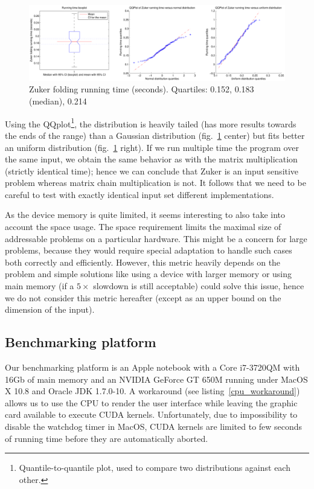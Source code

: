 \begin{figure}[H]\begin{center}\includegraphics[width=16cm]{inc/var_zuker.pdf}\end{center}
\caption{Zuker folding running time (seconds). Quartiles: 0.152, 0.183 (median), 0.214}\label{fig:var_zuker}\end{figure}

Using the QQplot\footnote{Quantile-to-quantile plot, used to compare two distributions against each other.}, the distribution is heavily tailed (has more results towards the ends of the range) than a Gaussian distribution (fig.~\ref{fig:var_zuker} center) but fits better an uniform distribution (fig.~\ref{fig:var_zuker} right). If we run multiple time the program over the same input, we obtain the same behavior as with the matrix multiplication (strictly identical time); hence we can conclude that Zuker is an input sensitive problem whereas matrix chain multiplication is not. It follows that we need to be careful to test with exactly identical input set different implementations.

As the device memory is quite limited, it seems interesting to also take into account the space usage. The space requirement limits the maximal size of addressable problems  on a particular hardware. This might be a concern for large problems, because they would require special adaptation to handle such cases both correctly and efficiently. However, this metric heavily depends on the problem and simple solutions like using a device with larger memory or using main memory (if a $5\times$ slowdown is still acceptable) could solve this issue, hence we do not consider this metric hereafter (except as an upper bound on the dimension of the input).

\subsection{Benchmarking platform}
Our benchmarking platform is an Apple notebook with a Core i7-3720QM with 16Gb of main memory and an NVIDIA GeForce GT 650M running under MacOS X 10.8 and Oracle JDK 1.7.0-10. A workaround (see listing~\ref{cpu_workaround}) allows us to use the CPU to render the user interface while leaving the graphic card available to execute CUDA kernels. Unfortunately, due to impossibility to disable the watchdog timer in MacOS, CUDA kernels are limited to few seconds of running time before they are automatically aborted.

